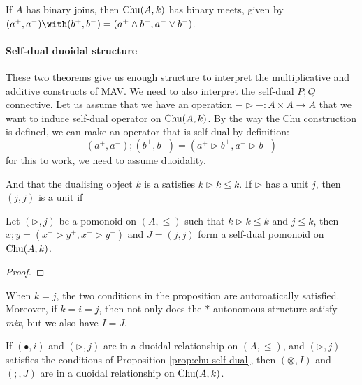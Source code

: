 \begin{proposition}
  If $A$ has binary joins, then $\mathrm{Chu}(A, k)$ has binary meets, given
  by $(a^+,a^-) \with (b^+,b^-) = (a^+ \land b^+, a^- \lor b^-)$.
\end{proposition}

\paragraph{Self-dual duoidal structure}
These two theorems give us enough structure to interpret the
multiplicative and additive constructs of MAV. We need to also
interpret the self-dual $P; Q$ connective. Let us assume that we have
an operation $-\rhd- : A \times A \to A$ that we want to induce
self-dual operator on $\mathrm{Chu}(A, k)$. By the way the Chu construction is
defined, we can make an operator that is self-dual by definition:
\begin{displaymath}
  (a^+, a^-) ; (b^+, b^-) = (a^+ \rhd b^+, a^- \rhd b^-)
\end{displaymath}
for this to work, we need to assume duoidality.

And that the dualising object $k$ is a
satisfies $k \rhd k \leq k$. If $\rhd$ has a unit $j$, then $(j, j)$ is a unit if

\begin{proposition}\label{prop:chu-self-dual}
  Let $(\rhd, j)$ be a pomonoid on $(A, \leq)$ such that
  $k \rhd k \leq k$ and $j \leq k$, then
  $x ; y = (x^+ \rhd y^+, x^- \rhd y^-)$ and $J = (j, j)$ form a
  self-dual pomonoid on $\mathrm{Chu}(A, k)$.
\end{proposition}

\begin{proof}
\end{proof}

\begin{remark}
  When $k = j$, the two conditions in the proposition are
  automatically satisfied. Moreover, if $k = i = j$, then not only
  does the $*$-autonomous structure satisfy \emph{mix}, but we also
  have $I =J$.
\end{remark}

\begin{lemma}
\end{lemma}

\begin{proposition}
  If $(\bullet, i)$ and $(\rhd, j)$ are in a duoidal relationship on
  $(A, \leq)$, and $(\rhd, j)$ satisfies the conditions of Proposition
  \ref{prop:chu-self-dual}, then $(\otimes, I)$ and $(;, J)$ are in a
  duoidal relationship on $\mathrm{Chu}(A, k)$.
\end{proposition}

